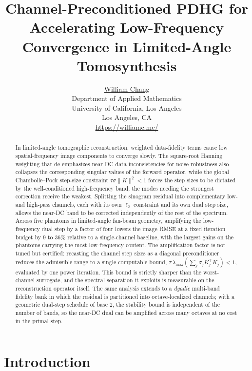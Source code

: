 \documentclass{article}
\title{Channel-Preconditioned PDHG for Accelerating Low-Frequency Convergence in Limited-Angle Tomosynthesis}
\date{}
\author{ \href{https://orcid.org/0000-0003-1700-756X}{William Chang} \\
	Department of Applied Mathematics\\
	University of California, Los Angeles\\
	Los Angeles, CA \\
	\url{https://williamc.me/}
}
\begin{document}
\maketitle

\begin{abstract}
In limited-angle tomographic reconstruction, weighted data-fidelity terms cause low spatial-frequency image components to converge slowly. The square-root Hanning weighting that de-emphasizes near-DC data inconsistencies for noise robustness also collapses the corresponding singular values of the forward operator, while the global Chambolle--Pock step-size constraint $\tau\sigma\|K\|^2<1$ forces the step sizes to be dictated by the well-conditioned high-frequency band; the modes needing the strongest correction receive the weakest. Splitting the sinogram residual into complementary low- and high-pass channels, each with its own $\ell_2$ constraint and its own dual step size, allows the near-DC band to be corrected independently of the rest of the spectrum. Across five phantoms in limited-angle fan-beam geometry, amplifying the low-frequency dual step by a factor of four lowers the image RMSE at a fixed iteration budget by $9$ to $36\%$ relative to a single-channel baseline, with the largest gains on the phantoms carrying the most low-frequency content. The amplification factor is not tuned but certified: recasting the channel step sizes as a diagonal preconditioner reduces the admissible range to a single computable bound, $\tau\,\lambda_{\max}(\sum_j\sigma_jK_j^\top K_j)<1$, evaluated by one power iteration. This bound is strictly sharper than the worst-channel surrogate, and the spectral separation it exploits is measurable on the reconstruction operator itself. The same analysis extends to a \emph{dyadic} multi-band fidelity bank in which the residual is partitioned into octave-localized channels; with a geometric dual-step schedule of base $2$, the stability bound is independent of the number of bands, so the near-DC dual can be amplified across many octaves at no cost in the primal step.
\end{abstract}

\section{Introduction}
\end{document}
